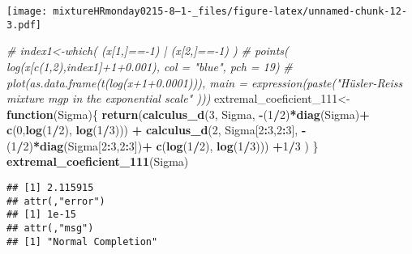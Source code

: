 \documentclass[
]{article}
\newenvironment{Shaded}{\begin{snugshade}}{\end{snugshade}}
\newcommand{\CommentTok}[1]{\textcolor[rgb]{0.56,0.35,0.01}{\textit{#1}}}
\newcommand{\ControlFlowTok}[1]{\textcolor[rgb]{0.13,0.29,0.53}{\textbf{#1}}}
\newcommand{\DecValTok}[1]{\textcolor[rgb]{0.00,0.00,0.81}{#1}}
\newcommand{\FunctionTok}[1]{\textcolor[rgb]{0.13,0.29,0.53}{\textbf{#1}}}
\newcommand{\NormalTok}[1]{#1}
\newcommand{\OtherTok}[1]{\textcolor[rgb]{0.56,0.35,0.01}{#1}}
\newcommand{\SpecialCharTok}[1]{\textcolor[rgb]{0.81,0.36,0.00}{\textbf{#1}}}
\begin{document}
\texttt{[image: mixtureHRmonday0215-8--1-\_files/figure-latex/unnamed-chunk-12-3.pdf]}

\begin{Shaded}
\begin{Highlighting}[]
\CommentTok{\# index1\textless{}{-}which( (x[1,]=={-}1) | (x[2,]=={-}1) )}
\CommentTok{\# points(   log(x[c(1,2),index1]+1+0.001), col = "blue", pch = 19)}
\CommentTok{\# plot(as.data.frame(t(log(x+1+0.0001))), main = expression(paste("Hüsler{-}Reiss mixture mgp in the exponential scale" )))}
\NormalTok{extremal\_coeficient\_111}\OtherTok{\textless{}{-}}\ControlFlowTok{function}\NormalTok{(Sigma)\{}
  \FunctionTok{return}\NormalTok{(}\FunctionTok{calculus\_d}\NormalTok{(}\DecValTok{3}\NormalTok{, Sigma, }\SpecialCharTok{{-}}\NormalTok{(}\DecValTok{1}\SpecialCharTok{/}\DecValTok{2}\NormalTok{)}\SpecialCharTok{*}\FunctionTok{diag}\NormalTok{(Sigma)}\SpecialCharTok{+} \FunctionTok{c}\NormalTok{(}\DecValTok{0}\NormalTok{,}\FunctionTok{log}\NormalTok{(}\DecValTok{1}\SpecialCharTok{/}\DecValTok{2}\NormalTok{), }\FunctionTok{log}\NormalTok{(}\DecValTok{1}\SpecialCharTok{/}\DecValTok{3}\NormalTok{))) }\SpecialCharTok{+} \FunctionTok{calculus\_d}\NormalTok{(}\DecValTok{2}\NormalTok{, Sigma[}\DecValTok{2}\SpecialCharTok{:}\DecValTok{3}\NormalTok{,}\DecValTok{2}\SpecialCharTok{:}\DecValTok{3}\NormalTok{], }\SpecialCharTok{{-}}\NormalTok{(}\DecValTok{1}\SpecialCharTok{/}\DecValTok{2}\NormalTok{)}\SpecialCharTok{*}\FunctionTok{diag}\NormalTok{(Sigma[}\DecValTok{2}\SpecialCharTok{:}\DecValTok{3}\NormalTok{,}\DecValTok{2}\SpecialCharTok{:}\DecValTok{3}\NormalTok{])}\SpecialCharTok{+} \FunctionTok{c}\NormalTok{(}\FunctionTok{log}\NormalTok{(}\DecValTok{1}\SpecialCharTok{/}\DecValTok{2}\NormalTok{), }\FunctionTok{log}\NormalTok{(}\DecValTok{1}\SpecialCharTok{/}\DecValTok{3}\NormalTok{))) }\SpecialCharTok{+}\DecValTok{1}\SpecialCharTok{/}\DecValTok{3}\NormalTok{  )}
\NormalTok{\}}
\FunctionTok{extremal\_coeficient\_111}\NormalTok{(Sigma)}
\end{Highlighting}
\end{Shaded}

\begin{verbatim}
## [1] 2.115915
## attr(,"error")
## [1] 1e-15
## attr(,"msg")
## [1] "Normal Completion"
\end{verbatim}
\end{document}
